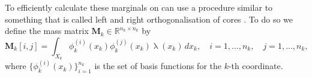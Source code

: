 To efficiently calculate these marginals on can use a procedure similar to something that is called left and right orthogonalisation of cores \cite{oseledets2011tensor}.
To do so we define the mass matrix $\bm{M}_k \in \mathbb{R}^{n_k \times n_k}$ by
\begin{equation}
	\bm{M}_k[i, j] = \int_{X_k} \phi^{(i)}_k(x_k) \phi^{(j)}_k(x_k)  \uplambda(x_k) \,dx_k, \quad i = 1, ..., n_k, \quad j = 1, ..., n_k,
\end{equation}
where $\{\phi^{(i)}_k(x_k)\}_{i=1}^{n_k}$ is the set of basis functions for the $k$-th coordinate.




